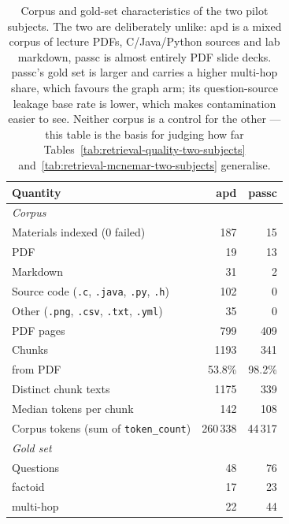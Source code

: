 \begin{table}[htbp]
  \centering
  \caption{Corpus and gold-set characteristics of the two pilot subjects. The two are deliberately
    unlike: apd is a mixed corpus of lecture PDFs, C/Java/Python sources and lab markdown, passc is
    almost entirely PDF slide decks. passc's gold set is larger and carries a higher multi-hop
    share, which favours the graph arm; its question-source leakage base rate is lower, which makes
    contamination easier to see. Neither corpus is a control for the other --- this table is the
    basis for judging how far Tables~\ref{tab:retrieval-quality-two-subjects}
    and~\ref{tab:retrieval-mcnemar-two-subjects} generalise.}
  \label{tab:corpus-two-subjects}
  \begin{tabular}{lrr}
    \toprule
    Quantity & apd & passc \\
    \midrule
    \multicolumn{3}{l}{\emph{Corpus}} \\
    Materials indexed (0 failed)          &     187 &      15 \\
    \quad PDF                             &      19 &      13 \\
    \quad Markdown                        &      31 &       2 \\
    \quad Source code (\texttt{.c}, \texttt{.java}, \texttt{.py}, \texttt{.h}) & 102 & 0 \\
    \quad Other (\texttt{.png}, \texttt{.csv}, \texttt{.txt}, \texttt{.yml})   &  35 & 0 \\
    PDF pages                             &     799 &     409 \\
    \midrule
    Chunks                                &    1193 &     341 \\
    \quad from PDF                        & 53.8\%  & 98.2\%  \\
    Distinct chunk texts                  &    1175 &     339 \\
    Median tokens per chunk               &     142 &     108 \\
    Corpus tokens (sum of \texttt{token\_count}) & 260\,338 & 44\,317 \\
    \midrule
    \multicolumn{3}{l}{\emph{Gold set}} \\
    Questions                             &      48 &      76 \\
    \quad factoid                         &      17 &      23 \\
    \quad multi-hop                       &      22 &      44 \\

\end{tabular}
\end{table}
